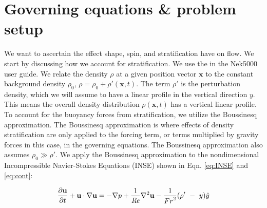 \section{Governing equations {\&} problem setup}
\label{section:governing_equations_and_setup}
We want to ascertain the effect shape, spin, and stratification have on flow. We start by discussing how we account for stratification. We use the in the Nek5000 user guide\cite{fischer_nek5000_nodate}. We relate the density $\rho$ at a given position vector $\mathbf{x}$ to the constant background density $\rho_0$, $\rho = \rho_0 + \rho ' (\mathbf{x},t)$. The term $\rho'$ is the perturbation density, which we will assume to have a linear profile in the vertical direction $y$. This means the overall density distribution $\rho(\mathbf{x},t)$ has a vertical linear profile. To account for the buoyancy forces from stratification, we utilize the Boussinesq approximation. The Boussinesq approximation is where effects of density stratification are only applied to the forcing term, or terms multiplied by gravity forces in this case, in the governing equations. The Boussinesq approximation also assumes $\rho_0 \gg \rho '$.
We apply the Boussinesq approximation to the nondimensional Incompressible Navier-Stokes Equations (INSE) shown in Eqn. \ref{eq:INSE} and \ref{eq:cont}:

\begin{equation}
    \label{eq:INSE}
    \frac{\partial\mathbf{u}}{\partial t}+\mathbf{u}\cdot\nabla\mathbf{u}=-\nabla p+\frac{1}{\mathit{Re}}\nabla^2\mathbf{u}-\frac{1}{{Fr}^2} (\rho^\prime\ -\ y )\hat{y}
\end{equation}

